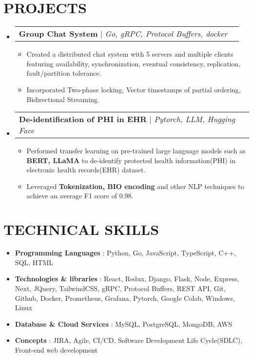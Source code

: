 \documentclass[letterpaper,10.9pt]{article}
\makeatletter
\newcommand{\resumeItem}[1]{
  \item\small{
    {#1 \vspace{-2pt}}
  }
}
\newcommand{\resumeskill}[2]{
\item 
      \textbf{ \small #1} \small : {\small #2}  \vspace{-5pt}\\
}
\newcommand{\resumeProjectHeading}[3]{
    \vspace{-2pt}\item
    \begin{tabular*}{1\textwidth}{l@{\extracolsep{\fill}}r}
      {\small #1}  {\small #2} | {\small #3}\\
    \end{tabular*}\vspace{-5pt}
}
\newcommand{\resumeSubHeadingListStart}{\begin{itemize}[leftmargin=0.0in, label={}]}
\newcommand{\resumeSubHeadingListEnd}{\end{itemize}}
\newcommand{\resumeItemListStart}{\begin{itemize}}
\newcommand{\resumeItemListEnd}{\end{itemize}\vspace{-7pt}}
\makeatother
\begin{document}
\section{PROJECTS}
    \resumeSubHeadingListStart
            \resumeProjectHeading
             {\textbf{Group Chat System}}{\href{https://github.com/CS2510-Distributed-Systems/Advanced-Group-Chat-System}{\faGithub}}{\emph{Go, gRPC, Protocol Buffers, docker}}
                \resumeItemListStart
                        \resumeItem{Created a distributed chat system with 5 servers and multiple clients featuring availability, synchronization, eventual consistency, replication, fault/partition tolerance.}
                        \resumeItem{Incorporated Two-phase locking, Vector timestamps of partial ordering, Bidirectional Streaming.}
              		\resumeItemListEnd
            \resumeProjectHeading
             {\textbf{De-identification of PHI in EHR}}{\href{https://github.com/dilipteja1/de-identification-of-PHI-in-Electronics-Health-Records.-/tree/main}{\faGithub}}{\emph{Pytorch, LLM, Hugging Face}}
          		    \resumeItemListStart
                            \resumeItem{Performed transfer learning on pre-trained large language models such as \textbf{BERT, LLaMA} to de-identify protected health information(PHI) in electronic health records(EHR) dataset.}
                            \resumeItem{Leveraged \textbf{Tokenization, BIO encoding} and other NLP techniques to achieve an average F1 score of 0.98.}
                        \resumeItemListEnd
            
    \resumeSubHeadingListEnd

\section{TECHNICAL SKILLS}
    \resumeSubHeadingListStart
        \resumeskill{Programming Languages}{Python, Go, JavaScript, TypeScript, C++, SQL, HTML}
        \resumeskill{Technologies \& libraries}{React, Redux, Django, Flask, Node, Express, Next, JQuery, TailwindCSS, gRPC,  Protocol Buffers, REST API, Git, Github, Docker, Prometheus, Grafana, Pytorch, Google Colab, Windows, Linux }
        \resumeskill{Database \& Cloud Services}{MySQL, PostgreSQL, MongoDB, AWS}
        \resumeskill{Concepts}{JIRA, Agile, CI/CD, Software Development Life Cycle(SDLC), Front-end web development}
    \resumeSubHeadingListEnd
    
\end{document}
